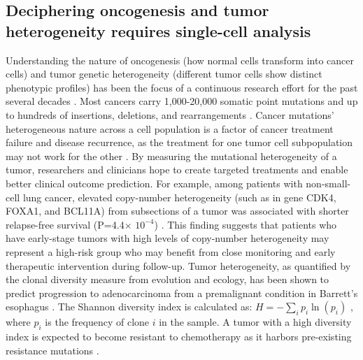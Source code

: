 \subsection{Deciphering oncogenesis and tumor heterogeneity requires single-cell analysis}
Understanding the nature of oncogenesis (how normal cells transform into cancer cells) and tumor genetic heterogeneity (different tumor cells show distinct phenotypic profiles) has been the focus of a continuous research effort for the past several decades \cite{Navin:2011jq,Nowell:1976ul,Tsujimoto:1984ti,Heppner:1984ve,Sebat:2004kp,Carter:2012ux}. 
Most cancers carry 1,000-20,000 somatic point mutations and up to hundreds of insertions, deletions, and rearrangements \cite{VOGELSTEIN:2013en,Martincorena:2015ki}. Cancer mutations' heterogeneous nature across a cell population is a factor of cancer treatment failure and disease recurrence, as the treatment for one tumor cell subpopulation may not work for the other \cite{Saadatpour:2015kn,Bedard:2013ww}. By measuring the mutational heterogeneity of a tumor, researchers and clinicians hope to create targeted treatments and enable better clinical outcome prediction. For example, among patients with non-small-cell lung cancer, elevated copy-number heterogeneity (such as in gene CDK4, FOXA1, and BCL11A) from subsections of a tumor was associated with shorter relapse-free survival (P=4.4$\times$ $10^{-4}$) \cite{JamalHanjani:2017cla}. This finding suggests that patients who have early-stage tumors with high levels of copy-number heterogeneity may represent a high-risk group who may benefit from close monitoring and early therapeutic intervention during follow-up. Tumor heterogeneity, as quantified by the clonal diversity measure from evolution and ecology, has been shown to predict progression to adenocarcinoma from a premalignant condition in Barrett's esophagus \cite{Maley:2006dd}. The Shannon diversity index is calculated as: $H = - \sum_i p_i \ln{(p_i)}$ , where $p_i$ is the frequency of clone $i$ in the sample. A tumor with a high diversity index is expected to become resistant to chemotherapy as it harbors pre-existing resistance mutations \cite{Navin:2014cm}. 

